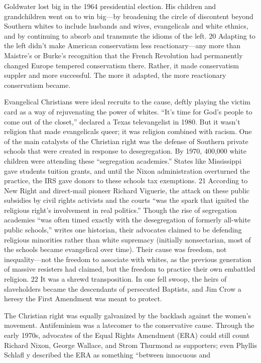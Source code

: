  \par 
Goldwater lost big in the 1964 presidential election. His children and grandchildren went on to win big—by broadening the circle of discontent beyond Southern whites to include husbands and wives, evangelicals and white ethnics, and by continuing to absorb and transmute the idioms of the left. {\color{blue}20} Adapting to the left didn’t make American conservatism less reactionary—any more than Maistre’s or Burke’s recognition that the French Revolution had permanently changed Europe tempered conservatism there. Rather, it made conservatism suppler and more successful. The more it adapted, the more reactionary conservatism became.
 \par 
Evangelical Christians were ideal recruits to the cause, deftly playing the victim card as a way of rejuvenating the power of whites. “It’s time for God’s people to come out of the closet,” declared a Texas televangelist in 1980. But it wasn’t religion that made evangelicals queer; it was religion combined with racism. One of the main catalysts of the Christian right was the defense of Southern private schools that were created in response to desegregation. By 1970, 400,000 white children were attending these “segregation academies.” States like Mississippi gave students tuition grants, and until the Nixon administration overturned the practice, the IRS gave donors to these schools tax exemptions. {\color{blue}21} According to New Right and direct-mail pioneer Richard Viguerie, the attack on these public subsidies by civil rights activists and the courts “was the spark that ignited the religious right’s involvement in real politics.” Though the rise of segregation academies “was often timed exactly with the desegregation of formerly all-white public schools,” writes one historian, their advocates claimed to be defending religious minorities rather than white supremacy (initially nonsectarian, most of the schools became evangelical over time). Their cause was freedom, not inequality—not the freedom to associate with whites, as the previous generation of massive resisters had claimed, but the freedom to practice their own embattled religion. {\color{blue}22} It was a shrewd transposition. In one fell swoop, the heirs of slaveholders became the descendants of persecuted Baptists, and Jim Crow a heresy the First Amendment was meant to protect.
 \par 
The Christian right was equally galvanized by the backlash against the women’s movement. Antifeminism was a latecomer to the conservative cause. Through the early 1970s, advocates of the Equal Rights Amendment (ERA) could still count Richard Nixon, George Wallace, and Strom Thurmond as supporters; even Phyllis Schlafl y described the ERA as something “between innocuous and
